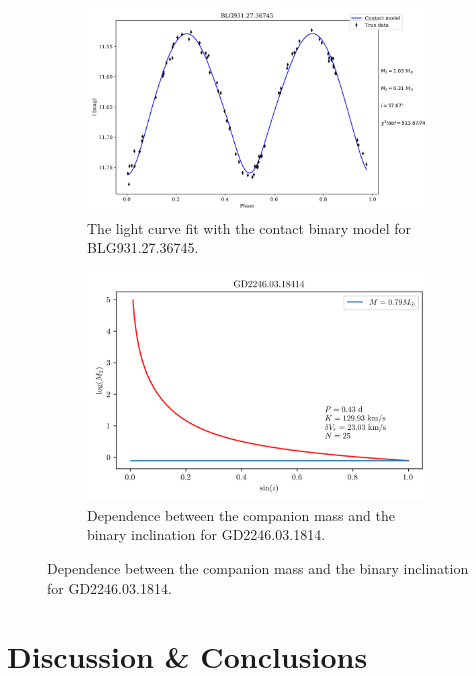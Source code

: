 \documentclass{pracalicmgr}
\begin{document}
\begin{figure}
    \begin{subfigure}{1\textwidth}
        \centering
        \includegraphics[scale=0.6]{plots/modeling_phoebe_contact_BLG931.27.36745.jpg}
        \caption{The light curve fit with the contact binary model for BLG931.27.36745.}\label{lc_plot}
    \end{subfigure}
    
    \begin{subfigure}{1\textwidth}
        \centering
        \includegraphics[width=\textwidth]{plots/GD2246.03.18414second_mass.png}
        \caption{Dependence between the companion mass and the binary inclination for GD2246.03.1814.}\label{second_mass}
    \end{subfigure}
\end{figure}


\chapter{Discussion \& Conclusions}
\end{document}
